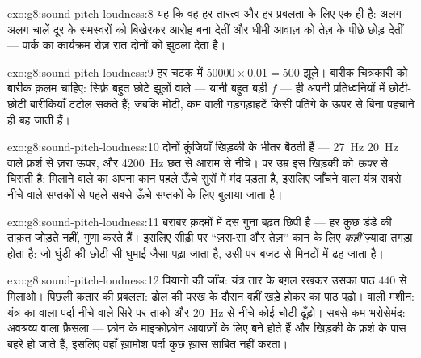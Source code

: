 \begin{solution}{exo:g8:sound-pitch-loudness:8}
यह कि वह  हर तारत्व और हर प्रबलता के लिए एक ही है: अलग-अलग चालें
दूर के समस्वरों को बिखेरकर आरोह बना देतीं और धीमी आवाज़ को तेज़ के
पीछे छोड़ देतीं --- पार्क का कार्यक्रम रोज़ रात दोनों को झुठला देता
है।
\end{solution}

\begin{solution}{exo:g8:sound-pitch-loudness:9}
हर चटक में $50000 \times 0.01 = 500$ झूले। बारीक चित्रकारी को बारीक
क़लम चाहिए: सिर्फ़ बहुत छोटे झूलों वाले  --- यानी बहुत बड़ी $f$
--- ही अपनी प्रतिध्वनियों में छोटी-छोटी बारीकियाँ टटोल सकते हैं; जबकि
मोटी, कम  वाली गड़गड़ाहटें किसी पतिंगे के ऊपर से बिना पहचाने ही
बह जाती हैं।
\end{solution}

\begin{solution}{exo:g8:sound-pitch-loudness:10}
दोनों कुंजियाँ खिड़की के भीतर बैठती हैं --- \qty{27}{Hz}
\qty{20}{Hz} वाले फ़र्श से ज़रा ऊपर, और \qty{4200}{Hz} छत से आराम से
नीचे। पर उम्र इस खिड़की को \emph{ऊपर} से घिसती है: मिलाने वाले का अपना
कान पहले ऊँचे सुरों में मंद पड़ता है, इसलिए जाँचने वाला यंत्र सबसे
नीचे वाले सप्तकों से पहले सबसे ऊँचे सप्तकों के लिए बुलाया जाता है।
\end{solution}

\begin{solution}{exo:g8:sound-pitch-loudness:11}
बराबर क़दमों में दस गुना बढ़त छिपी है --- हर कुछ डंडे  की ताक़त
जोड़ते नहीं, गुणा करते हैं। इसलिए सीढ़ी पर ``ज़रा-सा और तेज़'' कान के
लिए \emph{कहीं} ज़्यादा तगड़ा होता है: जो घुंडी की छोटी-सी घुमाई जैसा
पढ़ा जाता है, उसी पर बजट  से मिनटों में ढह जाता है।
\end{solution}

\begin{solution}{exo:g8:sound-pitch-loudness:12}
पियानो की जाँच: यंत्र तार के बग़ल रखकर उसका पाठ $440$ से मिलाओ। पिछली
क़तार की प्रबलता: ढोल की परख के दौरान वहीं खड़े होकर  का पाठ
पढ़ो।  वाली मशीन: यंत्र का  वाला पर्दा नीचे वाले सिरे पर
ताको और \qty{20}{Hz} से नीचे कोई चोटी ढूँढ़ो। सबसे कम भरोसेमंद:
अवश्रव्य वाला फ़ैसला --- फ़ोन के माइक्रोफ़ोन आवाज़ों के लिए बने होते
हैं और खिड़की के फ़र्श के पास बहरे हो जाते हैं, इसलिए वहाँ ख़ामोश पर्दा
कुछ ख़ास साबित नहीं करता।
\end{solution}

